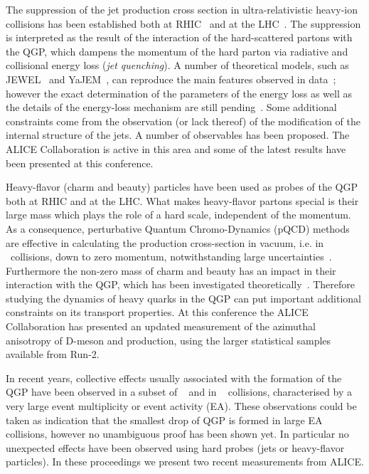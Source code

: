 \documentclass[10pt]{article}
\begin{document}
The suppression of the jet production cross section in ultra-relativistic heavy-ion collisions has been established both at RHIC~\cite{STAR:2017a} and at the LHC~\cite{ALICE:2015a}. The suppression is interpreted as the result of the interaction of the hard-scattered partons 
with the QGP, which dampens the momentum of the hard parton via radiative and collisional energy loss (\emph{jet quenching}). A number of theoretical models, such as JEWEL~\cite{Zapp:2014} and YaJEM~\cite{Renk:2013}, can reproduce
the main features observed in data~\cite{ALICE:2015a}; however the exact determination of the parameters of the energy loss as well as the details of the energy-loss mechanism are still pending~\cite{Burke:2013}. Some additional constraints come from the observation (or lack thereof) of
the modification of the internal structure of the jets. A number of observables has been proposed. The ALICE Collaboration is active in this area and some of the latest results have been presented at this conference.

Heavy-flavor (charm and beauty) particles have been used as probes of the QGP both at RHIC and at the LHC. What makes heavy-flavor partons special is their large mass which plays the role of a hard scale, 
independent of the momentum.
As a consequence, perturbative Quantum Chromo-Dynamics (pQCD) methods are effective in calculating the production cross-section in vacuum, i.e. in \pp\ collisions, down to zero momentum, notwithstanding large uncertainties~\cite{ALICE:2017a}.
Furthermore the non-zero mass of charm and beauty has an impact in their interaction with the QGP, which has been investigated theoretically~\cite{Dokshitzer:2001}.
Therefore studying the dynamics of heavy quarks in the QGP can put important additional constraints on its transport properties.
At this conference the ALICE Collaboration has presented an updated measurement of the azimuthal anisotropy of D-meson and \jpsi production, using the larger statistical samples available from Run-2.

In recent years, collective effects usually associated with the formation of the QGP have been observed in a subset of \pPb~\cite{CMS:2013b} and in \pp~\cite{ALICE:2017b} collisions, characterised by a very large event multiplicity or event activity (EA). These observations could be taken as indication that the smallest drop
of QGP is formed in large EA collisions, however no unambiguous proof has been shown yet. In particular no unexpected effects have been observed using hard probes (jets or heavy-flavor particles). In these proceedings we present two recent measurements from ALICE.
\end{document}
